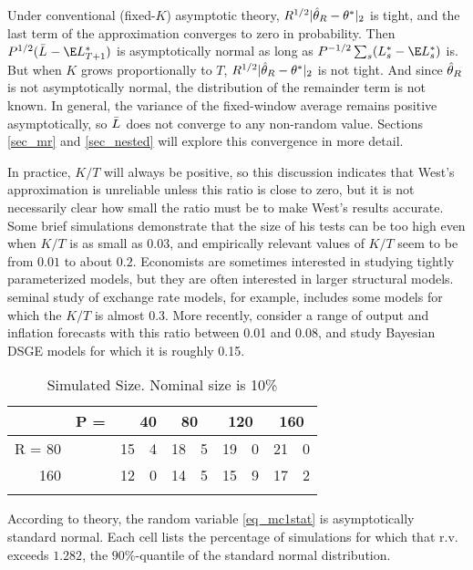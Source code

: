 \documentclass[11pt]{article} \def\baselinestretch{1.08}
\newcommand{\pp}[1]{#1} \newcommand{\intro}[1]{#1}
\begin{document}
Under conventional (fixed-$K$) asymptotic theory, $R^{1/2} |\hat \theta_{{}{R}} -
\theta_{}^*|_2$ is tight, and the last term of the approximation converges to
zero in probability.  Then $P^{1/2}(\el{} - \E \ft{}{T+1})$ is
asymptotically normal as long as $P^{-1/2}\sum_s (\ft{}{s} - \E
\ft{}{s})$ is. But when $K$ grows proportionally to $T$, $R^{1/2}
|\hat \theta_{{}{R}} - \theta_{}^*|_2$ is not tight. And since $\hat \theta_{{}{R}}$ is not
asymptotically normal, the distribution of the remainder term is not
known.  In general, the variance of the fixed-window average remains
positive asymptotically, so $\bar L_{}$ does not converge to any
non-random value.  Sections \ref{sec_mr} and \ref{sec_nested} will
explore this convergence in more detail. 

\intro{In practice, $K/T$ will always be positive, so this discussion
indicates that West's approximation is unreliable unless this ratio is
close to zero, but it is not necessarily clear how small the ratio
must be to make West's results accurate.  \pp{Some brief simulations
  demonstrate that 
the size of his tests can be too high even when $K/T$ is as small as
$0.03$, and empirically relevant values of $K/T$ seem to be from
$0.01$ to about $0.2$.}} Economists are sometimes interested in
studying tightly parameterized models, but they are often interested
in larger structural models.  
seminal study 
of exchange rate models, for example, includes some models for which
the $K/T$ is almost 0.3. More recently,
consider a range of output and inflation forecasts with this ratio
between 0.01 and 0.08, and  study
Bayesian DSGE models for which it is roughly 0.15.

\begin{table}[!tb]
    \label{tab_mc1stat}
    \begin{center}
    \caption{Simulated Size.  Nominal size is 10\%}
    \begin{tabular}{rrr@{.}lr@{.}lr@{.}lr@{.}l}
      & P = & \multicolumn{2}{r}{40} & \multicolumn{2}{c}{80}
      & \multicolumn{2}{c}{120} & \multicolumn{2}{c}{160} \\ \hline
      R = 80 && 15&4 & 18&5 & 19&0 & 21&0 \\
      160 && 12&0 & 14&5 & 15&9 & 17&2 \\ {}
    \end{tabular}
    \end{center}
    {\small
      According to  theory, the random variable
      \eqref{eq_mc1stat} is asymptotically standard normal.  Each cell
      lists the percentage of simulations for which that r.v. exceeds
      $1.282$, the $90\%$-quantile of the standard normal
      distribution.}
\end{table}
\end{document}
